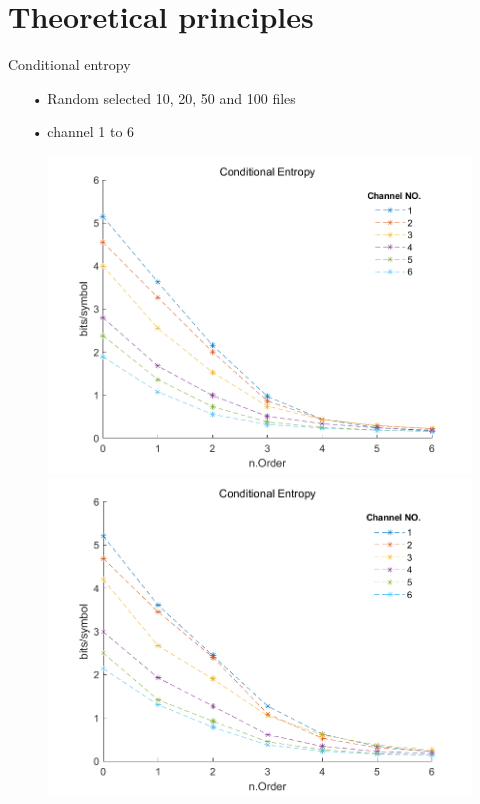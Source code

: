 \documentclass[notes=hide]{beamer}
\begin{document}
\section{Theoretical principles}
\begin{frame}


   \begin{block}{Conditional entropy}
   	\begin{itemize}
   		\item [•] Random selected 10, 20, 50 and 100 files
   		\item [•] channel 1 to 6
   	\end{itemize}
   \end{block}
   \begin{figure}
   	\includegraphics[scale=0.26]{Vortrag/10f6oc1to6.png}
   	\includegraphics[scale=0.26]{Vortrag/20f6oc1to6.png}

\end{figure}
\end{frame}
\end{document}

